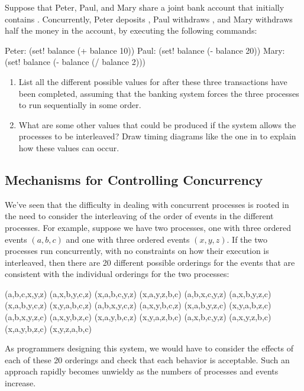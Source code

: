 \begin{exercise}
	\label{Exercise 3.38}
	Suppose that Peter, Paul, and Mary share a joint bank account that initially contains .
	Concurrently, Peter deposits , Paul withdraws , and Mary withdraws half the money in the account, by executing the following commands:
	\begin{scheme}
	  Peter: (set! balance (+ balance 10))
	  Paul:  (set! balance (- balance 20))
	  Mary:  (set! balance (- balance (/ balance 2)))
	\end{scheme}
	\begin{enumerate}[label = \alph*., leftmargin = *]

		\item
			List all the different possible values for  after these three transactions have been completed, assuming that the banking system forces the three processes to run sequentially in some order.

		\item
			What are some other values that could be produced if the system allows the processes to be interleaved?
			Draw timing diagrams like the one in  to explain how these values can occur.

	\end{enumerate}
\end{exercise}



\subsection{Mechanisms for Controlling Concurrency}
\label{Section 3.4.2}

We’ve seen that the difficulty in dealing with concurrent processes is rooted in the need to consider the interleaving of the order of events in the different processes.
For example, suppose we have two processes, one with three ordered events \( (a, b, c) \) and one with three ordered events \( (x, y, z) \).
If the two processes run concurrently, with no constraints on how their execution is interleaved, then there are 20 different possible orderings for the events that are consistent with the individual orderings for the two processes:
\begin{example}
	(a,b,c,x,y,z)  (a,x,b,y,c,z)  (x,a,b,c,y,z)  (x,a,y,z,b,c)
	(a,b,x,c,y,z)  (a,x,b,y,z,c)  (x,a,b,y,c,z)  (x,y,a,b,c,z)
	(a,b,x,y,c,z)  (a,x,y,b,c,z)  (x,a,b,y,z,c)  (x,y,a,b,z,c)
	(a,b,x,y,z,c)  (a,x,y,b,z,c)  (x,a,y,b,c,z)  (x,y,a,z,b,c)
	(a,x,b,c,y,z)  (a,x,y,z,b,c)  (x,a,y,b,z,c)  (x,y,z,a,b,c)
\end{example}
As programmers designing this system, we would have to consider the effects of each of these 20 orderings and check that each behavior is acceptable.
Such an approach rapidly becomes unwieldy as the numbers of processes and events increase.

